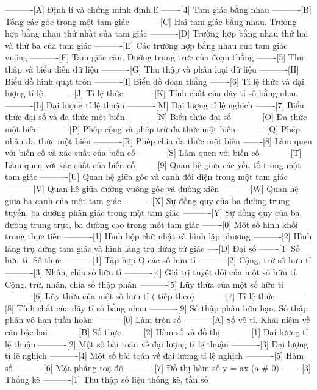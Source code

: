 ----------[A] Định lí và chứng minh định lí
-------[4] Tam giác bằng nhau
----------[B] Tổng các góc trong một tam giác
----------[C] Hai tam giác bằng nhau. Trường hợp bằng nhau thứ nhất của tam giác
----------[D] Trường hợp bằng nhau thứ hai và thứ ba của tam giác
----------[E] Các trường hợp bằng nhau của tam giác vuông
----------[F] Tam giác cân. Đường trung trực của đoạn thẳng
-------[5] Thu thập và biểu diễn dữ liệu
----------[G] Thu thập và phân loại dữ liệu
----------[H] Biểu đồ hình quạt tròn
----------[I] Biểu đồ đoạn thẳng
-------[6] Tỉ lệ thức và đại lượng tỉ lệ
----------[J] Tỉ lệ thức
----------[K] Tính chất của dãy tỉ số bằng nhau
----------[L] Đại lượng tỉ lệ thuận
----------[M] Đại lượng tỉ lệ nghịch
-------[7] Biểu thức đại số và đa thức một biến
----------[N] Biểu thức đại số
----------[O] Đa thức một biến
----------[P] Phép cộng và phép trừ đa thức một biến
----------[Q] Phép nhân đa thức một biến
----------[R] Phép chia đa thức một biến
-------[8] Làm quen với biến cố và xác suất của biến cố
----------[S] Làm quen với biến cố
----------[T] Làm quen với xác suất của biến cố
-------[9] Quan hệ giữa các yếu tố trong một tam giác
----------[U] Quan hệ giữa góc và cạnh đối diện trong một tam giác
----------[V] Quan hệ giữa đường vuông góc và đường xiên
----------[W] Quan hệ giữa ba cạnh của một tam giác
----------[X] Sự đồng quy của ba đường trung tuyến, ba đường phân giác trong một tam giác
----------[Y] Sự đồng quy của ba đường trung trực, ba đường cao trong một tam giác
-------[0] Một số hình khối trong thực tiễn
----------[1] Hình hộp chữ nhật và hình lập phương
----------[2] Hình lăng trụ đứng tam giác và hình lăng trụ đứng tứ giác
----[D] Đại số
-------[1] Số hữu tỉ. Số thực
----------[1] Tập hợp Q các số hữu tỉ
----------[2] Cộng, trừ số hữu tỉ
----------[3] Nhân, chia số hữu tỉ
----------[4] Giá trị tuyệt đối của một số hữu tỉ. Cộng, trừ, nhân, chia số thập phân
----------[5] Lũy thừa của một số hữu tỉ
----------[6] Lũy thừa của một số hữu tỉ ( tiếp theo)
----------[7] Tỉ lệ thức
----------[8] Tính chất của dãy tỉ số bằng nhau
----------[9] Số thập phân hữu hạn. Số thập phân vô hạn tuần hoàn
----------[0] Làm tròn số
----------[A] Số vô tỉ. Khái niệm về căn bậc hai
----------[B] Số thực
-------[2] Hàm số và đồ thị
----------[1] Đại lượng tỉ lệ thuận
----------[2] Một số bài toán về đại lượng tỉ lệ thuận
----------[3] Đại lượng tỉ lệ nghịch
----------[4] Một số bài toán về đại lượng tỉ lệ nghịch
----------[5] Hàm số
----------[6] Mặt phẳng toạ độ
----------[7] Đồ thị hàm số y = ax (a # 0)
-------[3] Thống kê
----------[1] Thu thập số liệu thống kê, tần số
